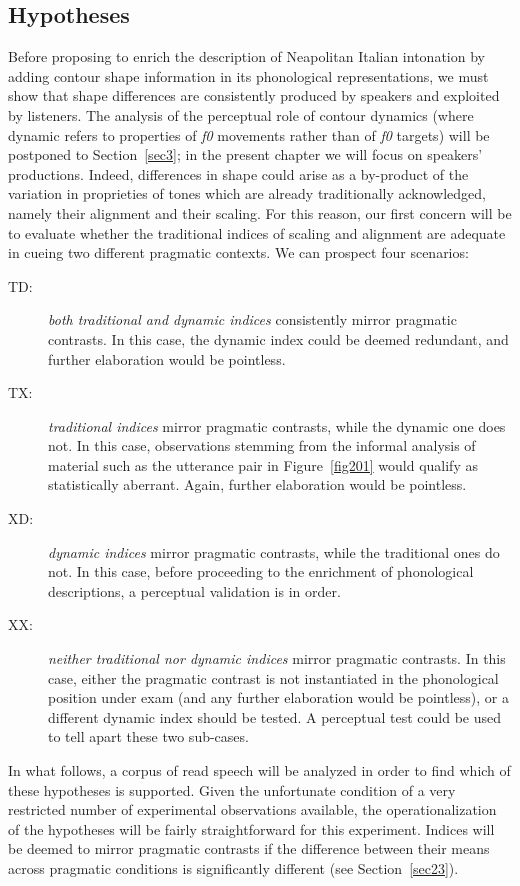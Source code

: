 \subsection{Hypotheses}\label{sec211}
Before proposing to enrich the description of Neapolitan Italian intonation by adding contour shape information in its phonological representations, we must show that shape differences are consistently produced by speakers and exploited by listeners. The analysis of the perceptual role of contour dynamics (where dynamic refers to properties of \textit{f0} movements rather than of \textit{f0} targets) will be postponed to Section~\ref{sec3}; in the present chapter we will focus on speakers' productions. Indeed, differences in shape could arise as a by-product of the variation in proprieties of tones which are already traditionally acknowledged, namely their alignment and their scaling. For this reason, our first concern will be to evaluate whether the traditional indices of scaling and alignment are adequate in cueing two different pragmatic contexts. We can prospect four scenarios:

\begin{description}
   \item[TD:] \textit{both traditional and dynamic indices} consistently mirror pragmatic contrasts. In this case, the dynamic index could be deemed redundant, and further elaboration would be pointless.
   \item[TX:] \textit{traditional indices} mirror pragmatic contrasts, while the dynamic one does not. In this case, observations stemming from the informal analysis of material such as the utterance pair in Figure~\ref{fig201} would qualify as statistically aberrant. Again, further elaboration would be pointless.
   \item[XD:] \textit{dynamic indices} mirror pragmatic contrasts, while the traditional ones do not. In this case, before proceeding to the enrichment of phonological descriptions, a perceptual validation is in order.
   \item[XX:] \textit{neither traditional nor dynamic indices} mirror pragmatic contrasts. In this case, either the pragmatic contrast is not instantiated in the phonological position under exam (and any further elaboration would be pointless), or a different dynamic index should be tested. A perceptual test could be used to tell apart these two sub-cases.
\end{description}

In what follows, a corpus of read speech will be analyzed in order to find which of these hypotheses is supported. Given the unfortunate condition of a very restricted number of experimental observations available, the operationalization of the hypotheses will be fairly straightforward for this experiment. Indices will be deemed to mirror pragmatic contrasts if the difference between their means across pragmatic conditions is significantly different (see Section~\ref{sec23}).

